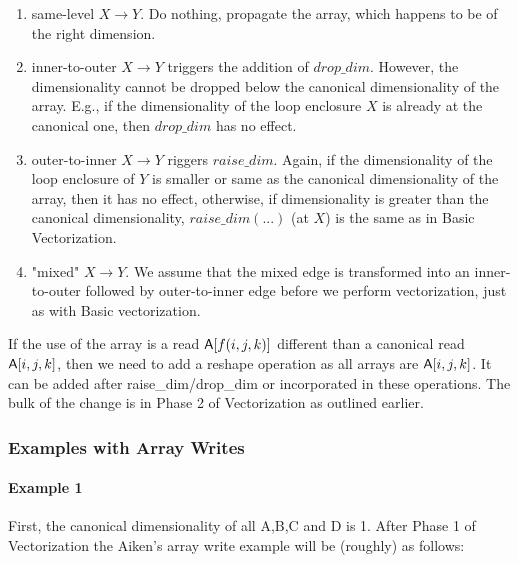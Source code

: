 \begin{enumerate}

\item same-level $X \rightarrow Y$. Do nothing, propagate the array, which happens to be of the right dimension.

\item inner-to-outer $X \rightarrow Y$ triggers the addition of $\mathit{drop\_dim}$. However, the dimensionality cannot be dropped below the canonical dimensionality of the array. E.g., if the dimensionality of the loop enclosure $X$ is already at the canonical one, then $\mathit{drop\_dim}$ has no effect.

\item outer-to-inner $X \rightarrow Y$ riggers  $\mathit{raise\_dim}$. Again, if the dimensionality of the loop enclosure of $Y$ is smaller or same as the canonical dimensionality of the array, then it has no effect, otherwise, if dimensionality is greater than the canonical dimensionality, $\mathit{raise\_dim(...)}$ (at $X$) is the same as in Basic Vectorization.

\item "mixed" $X \rightarrow Y$. We assume that the mixed edge is transformed into an inner-to-outer followed by outer-to-inner edge before we perform vectorization, just as with Basic vectorization.

\end{enumerate}

If the use of the array is a read ${\sf A}[f(i,j,k)]$ different than a canonical read ${\sf A}[i,j,k]$, then we need to add a reshape operation as
all arrays are ${\sf A}[i,j,k]$. It can be added after raise\_dim/drop\_dim or incorporated in these operations.
The bulk of the change is in Phase 2 of Vectorization as outlined earlier.

\subsubsection{Examples with Array Writes}

\paragraph{Example 1}

First, the canonical dimensionality of all {\sf A,B,C} and {\sf D} is 1.
After Phase 1 of Vectorization the Aiken's array write example will be (roughly) as follows:

